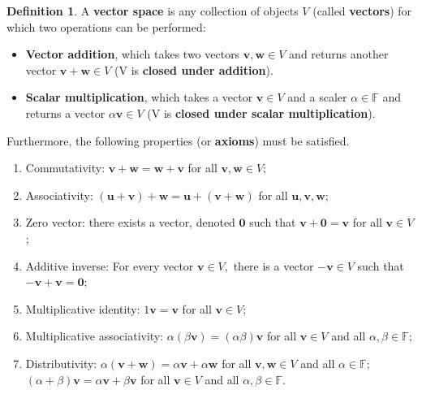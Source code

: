 \documentclass[12pt, a4paper]{article}
\theoremstyle{definition}
\newtheorem{definition}{Definition}[section]
\theoremstyle{plain}
\newcommand{\bb}[1]{\mathbb{#1}}
\newcommand{\vect}[1]{\mathbf{#1}}
\begin{document}
\begin{definition} A \textbf{vector space} is any collection of objects $V$ (called \textbf{vectors}) for which two operations can be performed:

\begin{itemize}

	\item \textbf{Vector addition}, which takes two vectors $\vect{v,w} \in V$ and returns another vector $\vect{v+w} \in V$ (V is \textbf{closed under addition}).

	\item \textbf{Scalar multiplication}, which takes a vector $\vect{v} \in V$ and a scaler $\alpha \in \bb{F}$ and returns a vector $\alpha\vect{v} \in V$ (V is \textbf{closed under scalar multiplication}).

\end{itemize}

Furthermore, the following properties (or \textbf{axioms}) must be satisfied.

\begin{enumerate}
	
	\item Commutativity: $\vect{v+w=w+v}$ for all $\vect{v,w} \in V$;

	\item Associativity: $(\vect{u+v})+\vect{w}=\vect{u}+(\vect{v+w})$ for all $\vect{u,v,w};$

	\item Zero vector: there exists a vector, denoted $\vect{0}$ such that $\vect{v+0=v}$ for all $\vect{v} \in V$;

	\item Additive inverse: For every vector $\vect{v} \in V,$ there is a vector $\vect{-v} \in V$ such that $\vect{-v+v=0}$;

	\item Multiplicative identity: $1\vect{v=v}$ for all $\vect{v} \in V$;

	\item Multiplicative associativity: $\alpha(\beta\vect{v})=(\alpha\beta)\vect{v}$ for all $\vect{v} \in V$ and all $\alpha,\beta \in \bb{F};$

	\item Distributivity: $\alpha(\vect{v+w})=\alpha\vect{v}+\alpha\vect{w}$ for all $\vect{v,w} \in V$ and all $\alpha \in \bb{F};$ \\
	$(\alpha+\beta)\vect{v}=\alpha\vect{v}+\beta\vect{v}$ for all $\vect{v}\in V$ and all $\alpha,\beta \in \bb{F}.$

\end{enumerate}

\end{definition}
\end{document}
